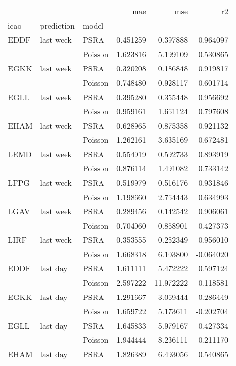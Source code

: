 \begin{tabular}{lllrrr}
\toprule
     &          &      &       mae &        mse &        r2 \\
icao & prediction & model &           &            &           \\
\midrule
EDDF & last week & PSRA &  0.451259 &   0.397888 &  0.964097 \\
     &          & Poisson &  1.623816 &   5.199109 &  0.530865 \\
EGKK & last week & PSRA &  0.320208 &   0.186848 &  0.919817 \\
     &          & Poisson &  0.748480 &   0.928117 &  0.601714 \\
EGLL & last week & PSRA &  0.395280 &   0.355448 &  0.956692 \\
     &          & Poisson &  0.959161 &   1.661124 &  0.797608 \\
EHAM & last week & PSRA &  0.628965 &   0.875358 &  0.921132 \\
     &          & Poisson &  1.262161 &   3.635169 &  0.672481 \\
LEMD & last week & PSRA &  0.554919 &   0.592733 &  0.893919 \\
     &          & Poisson &  0.876114 &   1.491082 &  0.733142 \\
LFPG & last week & PSRA &  0.519979 &   0.516176 &  0.931846 \\
     &          & Poisson &  1.198660 &   2.764443 &  0.634993 \\
LGAV & last week & PSRA &  0.289456 &   0.142542 &  0.906061 \\
     &          & Poisson &  0.704060 &   0.868901 &  0.427373 \\
LIRF & last week & PSRA &  0.353555 &   0.252349 &  0.956010 \\
     &          & Poisson &  1.668318 &   6.103800 & -0.064020 \\
EDDF & last day & PSRA &  1.611111 &   5.472222 &  0.597124 \\
     &          & Poisson &  2.597222 &  11.972222 &  0.118581 \\
EGKK & last day & PSRA &  1.291667 &   3.069444 &  0.286449 \\
     &          & Poisson &  1.659722 &   5.173611 & -0.202704 \\
EGLL & last day & PSRA &  1.645833 &   5.979167 &  0.427334 \\
     &          & Poisson &  1.944444 &   8.236111 &  0.211170 \\
EHAM & last day & PSRA &  1.826389 &   6.493056 &  0.540865 \\

\end{tabular}
